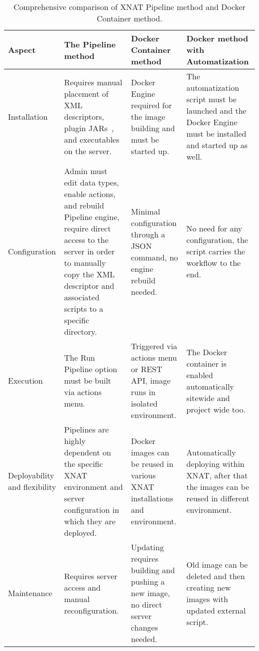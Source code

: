 \begin{table}[htbp]
  \centering
  \caption{Comprehensive comparison of XNAT Pipeline method and Docker Container method.}
  \label{tab:pipeline-vs-docker}

  \begin{tabular}{|>{\centering\arraybackslash}p{2cm}|
                      >{\centering\arraybackslash}p{4cm}|
                      >{\centering\arraybackslash}p{4cm}|
                      >{\centering\arraybackslash}p{4cm}|}
    \hline
    \textbf{Aspect} & \textbf{The Pipeline method} & \textbf{Docker Container method} & \textbf{Docker method with Automatization }\\ \hline
    
    
    Installation & Requires manual placement of XML descriptors, plugin JARs~\cite{installpipeline}, and executables on the server. & Docker Engine required for the image building and must be started up. & The automatization script must be launched and the Docker Engine must be installed and started up as well. \\ \hline
    

    
    Configuration & Admin must edit data types, enable actions, and rebuild Pipeline engine, require direct access to the server in order to manually copy the XML descriptor and associated scripts to a specific directory. & Minimal configuration through a JSON command, no engine rebuild needed. & No need for any configuration, the script carries the workflow to the end. \\ \hline
    
    Execution & The Run Pipeline option must be built via actions menu. & Triggered via actions menu or REST API, image runs in isolated environment. & The Docker container is enabled automatically sitewide and project wide too. \\ \hline

    Deployability and flexibility & Pipelines are highly dependent on the specific XNAT environment and server configuration in which they are deployed. & Docker images can be reused in various XNAT installations and environment. & Automatically deploying within XNAT, after that the images can be reused in different environment. \\ \hline
    
    Maintenance & Requires server access and manual reconfiguration. & Updating requires building and pushing a new image, no direct server changes needed. & Old image can be deleted and then creating new images with updated external script.\\ \hline
    

\end{tabular}
\end{table}
